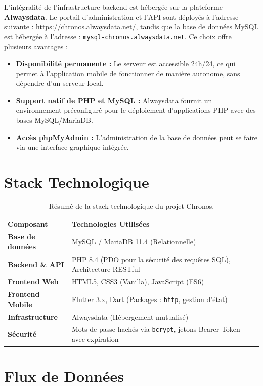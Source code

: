 \documentclass[12pt, a4paper]{report}
\begin{document}
L'intégralité de l'infrastructure backend est hébergée sur la plateforme \textbf{Alwaysdata}. Le portail d'administration et l'API sont déployés à l'adresse suivante : \url{https://chronos.alwaysdata.net/}, tandis que la base de données MySQL est hébergée à l'adresse : \texttt{mysql-chronos.alwaysdata.net}. Ce choix offre plusieurs avantages :

\begin{itemize}
    \item \textbf{Disponibilité permanente :} Le serveur est accessible 24h/24, ce qui permet à l'application mobile de fonctionner de manière autonome, sans dépendre d'un serveur local.
    \item \textbf{Support natif de PHP et MySQL :} Alwaysdata fournit un environnement préconfiguré pour le déploiement d'applications PHP avec des bases MySQL/MariaDB.
    \item \textbf{Accès phpMyAdmin :} L'administration de la base de données peut se faire via une interface graphique intégrée.
\end{itemize}

\section{Stack Technologique}

\begin{table}[H]
\centering
\renewcommand{\arraystretch}{1.4}
\begin{tabularx}{\textwidth}{>{\bfseries}l X}
\toprule
\textbf{Composant} & \textbf{Technologies Utilisées} \\
\midrule
Base de données & MySQL / MariaDB 11.4 (Relationnelle) \\
Backend \& API & PHP 8.4 (PDO pour la sécurité des requêtes SQL), Architecture RESTful \\
Frontend Web & HTML5, CSS3 (Vanilla), JavaScript (ES6) \\
Frontend Mobile & Flutter 3.x, Dart (Packages : \texttt{http}, gestion d'état) \\
Infrastructure & Alwaysdata (Hébergement mutualisé) \\
Sécurité & Mots de passe hachés via \texttt{bcrypt}, jetons Bearer Token avec expiration \\
\bottomrule
\end{tabularx}
\caption{Résumé de la stack technologique du projet Chronos.}
\end{table}

\section{Flux de Données}
\end{document}
